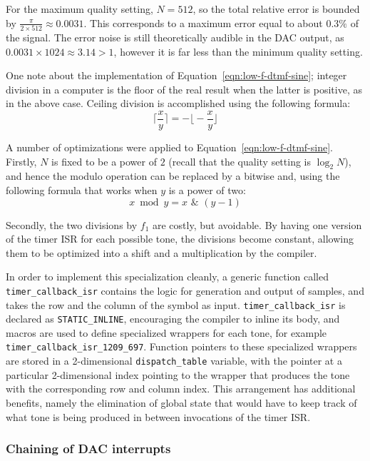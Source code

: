 \documentclass[11pt,a4paper,twocolumn]{scrartcl}
\begin{document}
For the maximum quality setting, $N = 512$, so the total relative error is bounded by $\frac{\pi}{2\times 512} \approx 0.0031$. This corresponds to a maximum error equal to about $0.3\%$ of the signal. The error noise is still theoretically audible in the DAC output, as $0.0031 \times 1024 \approx 3.14 > 1$, however it is far less than the minimum quality setting.

One note about the implementation of Equation~\ref{eqn:low-f-dtmf-sine}; integer division in a computer is the floor of the real result when the latter is positive, as in the above case. Ceiling division is accomplished using the following formula\cite{warren2012hacker}:
$$ \bigg\lceil \frac{x}{y} \bigg\rceil = -\bigg\lfloor -\frac{x}{y} \bigg\rfloor $$

A number of optimizations were applied to Equation~\ref{eqn:low-f-dtmf-sine}. Firstly, $N$ is fixed to be a power of $2$ (recall that the quality setting is $\log_2 N$), and hence the modulo operation can be replaced by a bitwise and, using the following formula that works when $y$ is a power of two:
$$ x \bmod y = x \,\,\&\,\, (y - 1) $$

Secondly, the two divisions by $f_1$ are costly, but avoidable. By having one version of the timer ISR for each possible tone, the divisions become constant, allowing them to be optimized into a shift and a multiplication by the compiler\cite{warren2012hacker}. 

In order to implement this specialization cleanly, a generic function called \verb!timer_callback_isr! contains the logic for generation and output of samples, and takes the row and the column of the symbol as input. \verb!timer_callback_isr! is declared as \verb!STATIC_INLINE!, encouraging the compiler to inline its body, and macros are used to define specialized wrappers for each tone, for example \verb!timer_callback_isr_1209_697!. Function pointers to these specialized wrappers are stored in a 2-dimensional \verb!dispatch_table! variable, with the pointer at a particular 2-dimensional index pointing to the wrapper that produces the tone with the corresponding row and column index. This arrangement has additional benefits, namely the elimination of global state that would have to keep track of what tone is being produced in between invocations of the timer ISR.

\subsubsection{Chaining of DAC interrupts}
\end{document}
